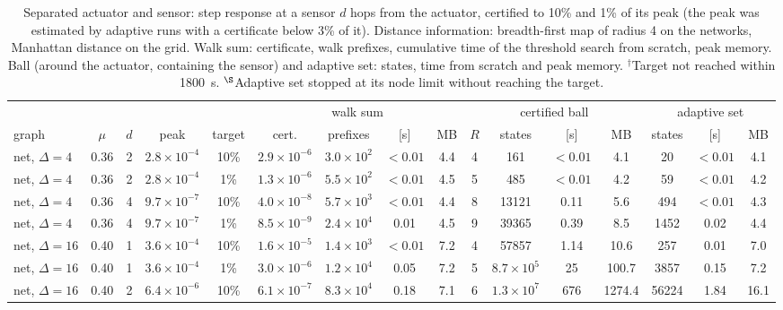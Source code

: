 \documentclass[aps,pra,superscriptaddress,floatfix,longbibliography,twocolumn]{revtex4-2}
\begin{document}
\begin{table}[t]
\footnotesize\setlength{\tabcolsep}{2.6pt}
\caption{Separated actuator and sensor: step response at a sensor $d$ hops from the actuator, certified to 10\% and 1\% of its peak (the peak was estimated by adaptive runs with a certificate below 3\% of it). Distance information: breadth-first map of radius 4 on the networks, Manhattan distance on the grid. Walk sum: certificate, walk prefixes, cumulative time of the threshold search from scratch, peak memory. Ball (around the actuator, containing the sensor) and adaptive set: states, time from scratch and peak memory. $^\dagger$Target not reached within 1800~s. $^\S$Adaptive set stopped at its node limit without reaching the target.}\label{tab:noncol}
\begin{ruledtabular}
\begin{tabular}{lcccc|cccc|cccc|ccc}
 & & & & & \multicolumn{4}{c|}{walk sum} & \multicolumn{4}{c|}{certified ball} & \multicolumn{3}{c}{adaptive set}\\
graph & $\mu$ & $d$ & peak & target & cert. & prefixes & [s] & MB & $R$ & states & [s] & MB & states & [s] & MB\\\hline
net, $\Delta=4$ & 0.36 & 2 & $2.8\times10^{-4}$ & 10\% & $2.9\times10^{-6}$ & $3.0\times10^{2}$ & $<0.01$ & 4.4 & 4 & 161 & $<0.01$ & 4.1 & 20 & $<0.01$ & 4.1 \\
net, $\Delta=4$ & 0.36 & 2 & $2.8\times10^{-4}$ & 1\% & $1.3\times10^{-6}$ & $5.5\times10^{2}$ & $<0.01$ & 4.5 & 5 & 485 & $<0.01$ & 4.2 & 59 & $<0.01$ & 4.2 \\
net, $\Delta=4$ & 0.36 & 4 & $9.7\times10^{-7}$ & 10\% & $4.0\times10^{-8}$ & $5.7\times10^{3}$ & $<0.01$ & 4.4 & 8 & 13121 & 0.11 & 5.6 & 494 & $<0.01$ & 4.3 \\
net, $\Delta=4$ & 0.36 & 4 & $9.7\times10^{-7}$ & 1\% & $8.5\times10^{-9}$ & $2.4\times10^{4}$ & 0.01 & 4.5 & 9 & 39365 & 0.39 & 8.5 & 1452 & 0.02 & 4.4 \\
net, $\Delta=16$ & 0.40 & 1 & $3.6\times10^{-4}$ & 10\% & $1.6\times10^{-5}$ & $1.4\times10^{3}$ & $<0.01$ & 7.2 & 4 & 57857 & 1.14 & 10.6 & 257 & 0.01 & 7.0 \\
net, $\Delta=16$ & 0.40 & 1 & $3.6\times10^{-4}$ & 1\% & $3.0\times10^{-6}$ & $1.2\times10^{4}$ & 0.05 & 7.2 & 5 & $8.7\times10^{5}$ & 25 & 100.7 & 3857 & 0.15 & 7.2 \\
net, $\Delta=16$ & 0.40 & 2 & $6.4\times10^{-6}$ & 10\% & $6.1\times10^{-7}$ & $8.3\times10^{4}$ & 0.18 & 7.1 & 6 & $1.3\times10^{7}$ & 676 & 1274.4 & 56224 & 1.84 & 16.1 \\

\end{tabular}
\end{ruledtabular}
\end{table}
\end{document}

